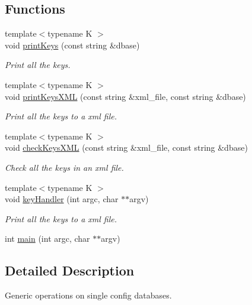 \subsection*{Functions}
\begin{DoxyCompactItemize}
\item 
{\footnotesize template$<$typename K $>$ }\\void \mbox{\hyperlink{adat-devel_2main_2dbutil_2dbkeys_8cc_a05c6483ffb9fa71112b451a5dd7eb935}{print\+Keys}} (const string \&dbase)
\begin{DoxyCompactList}\small\item\em Print all the keys. \end{DoxyCompactList}\item 
{\footnotesize template$<$typename K $>$ }\\void \mbox{\hyperlink{adat-devel_2main_2dbutil_2dbkeys_8cc_a44428d59560cb466420c5c0ca60315e5}{print\+Keys\+X\+ML}} (const string \&xml\+\_\+file, const string \&dbase)
\begin{DoxyCompactList}\small\item\em Print all the keys to a xml file. \end{DoxyCompactList}\item 
{\footnotesize template$<$typename K $>$ }\\void \mbox{\hyperlink{adat-devel_2main_2dbutil_2dbkeys_8cc_a9c4b0a95ff975fd696e640d75b7963cf}{check\+Keys\+X\+ML}} (const string \&xml\+\_\+file, const string \&dbase)
\begin{DoxyCompactList}\small\item\em Check all the keys in an xml file. \end{DoxyCompactList}\item 
{\footnotesize template$<$typename K $>$ }\\void \mbox{\hyperlink{adat-devel_2main_2dbutil_2dbkeys_8cc_a55a23fb2c13bc6ba3c5942ed08294e75}{key\+Handler}} (int argc, char $\ast$$\ast$argv)
\begin{DoxyCompactList}\small\item\em Print all the keys to a xml file. \end{DoxyCompactList}\item 
int \mbox{\hyperlink{adat-devel_2main_2dbutil_2dbkeys_8cc_a3c04138a5bfe5d72780bb7e82a18e627}{main}} (int argc, char $\ast$$\ast$argv)
\end{DoxyCompactItemize}


\subsection{Detailed Description}
Generic operations on single config databases. 



